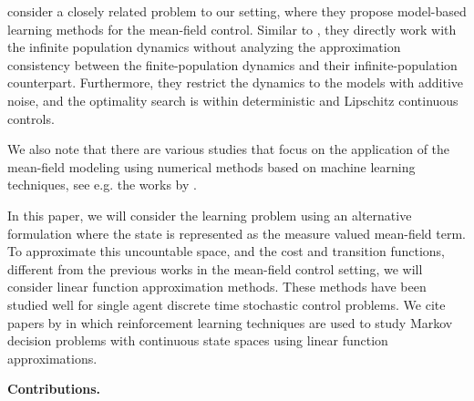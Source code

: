 \documentclass[twoside,11pt]{article}
\begin{document}
\cite{pasztor2023efficient} consider a closely related problem to our setting, where they propose model-based learning methods for the mean-field control. Similar to \cite{gu2021mean,gu2019dynamic}, they directly work with the infinite population dynamics without analyzing the approximation consistency between the finite-population dynamics and their infinite-population counterpart. Furthermore, they restrict the dynamics to the models with additive noise, and the optimality search is within deterministic and Lipschitz continuous controls. 


We also note that there are various studies that focus on the application of the mean-field modeling using numerical methods based on machine learning techniques, see e.g. the works by \cite{ruthotto2020machine,achdou2020mean,lauriere2022scalable}.

In this paper, we will consider the learning problem using an alternative formulation where the state is represented as the measure valued mean-field term. To approximate this uncountable space, and the cost and transition functions, different from the previous works in the mean-field control setting, we will consider linear function approximation methods. These methods have been studied well for single agent discrete time stochastic control problems. We cite papers by \cite{melo2008analysis,carvalho2020new,CsabaSmart,jin2020provably,meyn2024projected} in which reinforcement learning techniques are used to study Markov decision problems with continuous state spaces using linear function approximations. 


{\bf Contributions.}
\end{document}
